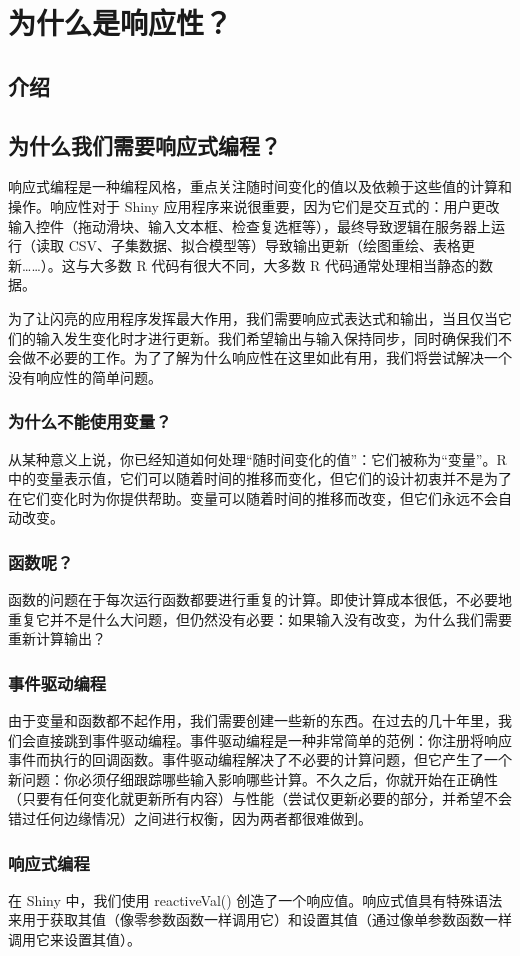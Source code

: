 \chapter{为什么是响应性？\label{ch13}}
\section{介绍}
\section{为什么我们需要响应式编程？}
响应式编程是一种编程风格，重点关注随时间变化的值以及依赖于这些值的计算和操作。响应性对于 Shiny 应用程序来说很重要，因为它们是交互式的：用户更改输入控件（拖动滑块、输入文本框、检查复选框等），最终导致逻辑在服务器上运行（读取 CSV、子集数据、拟合模型等）导致输出更新（绘图重绘、表格更新……）。这与大多数 R 代码有很大不同，大多数 R 代码通常处理相当静态的数据。

为了让闪亮的应用程序发挥最大作用，我们需要响应式表达式和输出，当且仅当它们的输入发生变化时才进行更新。我们希望输出与输入保持同步，同时确保我们不会做不必要的工作。为了了解为什么响应性在这里如此有用，我们将尝试解决一个没有响应性的简单问题。
\subsection{为什么不能使用变量？}
从某种意义上说，你已经知道如何处理“随时间变化的值”：它们被称为“变量”。R 中的变量表示值，它们可以随着时间的推移而变化，但它们的设计初衷并不是为了在它们变化时为你提供帮助。变量可以随着时间的推移而改变，但它们永远不会自动改变。
\subsection{函数呢？}
函数的问题在于每次运行函数都要进行重复的计算。即使计算成本很低，不必要地重复它并不是什么大问题，但仍然没有必要：如果输入没有改变，为什么我们需要重新计算输出？
\subsection{事件驱动编程}
由于变量和函数都不起作用，我们需要创建一些新的东西。在过去的几十年里，我们会直接跳到事件驱动编程。事件驱动编程是一种非常简单的范例：你注册将响应事件而执行的回调函数。事件驱动编程解决了不必要的计算问题，但它产生了一个新问题：你必须仔细跟踪哪些输入影响哪些计算。不久之后，你就开始在正确性（只要有任何变化就更新所有内容）与性能（尝试仅更新必要的部分，并希望不会错过任何边缘情况）之间进行权衡，因为两者都很难做到。
\subsection{响应式编程}
在 Shiny 中，我们使用 reactiveVal() 创造了一个响应值。响应式值具有特殊语法来用于获取其值（像零参数函数一样调用它）和设置其值（通过像单参数函数一样调用它来设置其值）。

